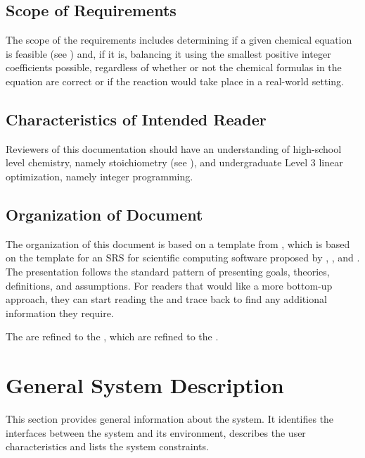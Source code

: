 \documentclass[12pt]{article}
\begin{document}
\subsection{Scope of Requirements} \label{sec_scope}

The scope of the requirements includes determining if a given chemical equation
is feasible (see ) and, if it is, balancing it using the
smallest positive integer coefficients possible, regardless of whether or not the
chemical formulas in the equation are correct or if the reaction would take
place in a real-world setting.

\subsection{Characteristics of Intended Reader} \label{sec_IntendedReader}
Reviewers of this documentation should have an understanding of high-school
level chemistry, namely stoichiometry (see ), and
undergraduate Level 3 linear optimization, namely integer programming.

\subsection{Organization of Document}
The organization of this document is based on a template from
\cite{smith_captemplate_2022}, which is based on the template for an SRS for
scientific computing software proposed by \cite{SmithAndLai2005},
\cite{SmithEtAl2007}, and \cite{koothoor_document_2013}. The presentation
follows the standard pattern of presenting goals, theories, definitions, and
assumptions. For readers that would like a more bottom-up approach, they can
start reading the  and trace back to find any additional
information they require.

The  are refined to the , which are
refined to the .

\section{General System Description} \label{sec_genSysDesc}

This section provides general information about the system.  It identifies the
interfaces between the system and its environment, describes the user
characteristics and lists the system constraints.
\end{document}
